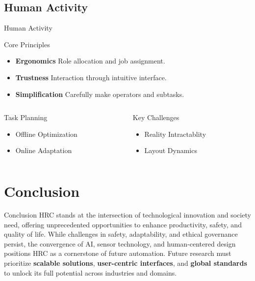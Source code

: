 \documentclass{beamer}
\begin{document}
\subsection{Human Activity}
\begin{frame}{Human Activity}

\begin{block}{Core Principles}
\begin{itemize}
\item \textbf{Ergonomics} Role allocation and job assignment.
\item \textbf{Trustness}  Interaction through intuitive interface.
\item \textbf{Simplification} Carefully make operators and subtasks.
\end{itemize}
\end{block}

\vspace{3mm}

\begin{columns}
\begin{column}{0.45\textwidth}
\begin{block}{Task Planning}
\begin{itemize}
\item Offline Optimization
\item Online Adaptation
\end{itemize}
\end{block}
\end{column}

\begin{column}{0.45\textwidth}
\begin{block}{Key Challenges}
\begin{itemize}
\item Reality Intractablity
\item Layout Dynamics
\end{itemize}
\end{block}
\end{column}
\end{columns}

\end{frame}

\section{Conclusion}
\begin{frame}{Conclusion}
\justifying
HRC stands at the intersection of technological innovation and society need, offering unprecedented opportunities to enhance productivity, safety, and quality of life. While challenges in safety, adaptability, and ethical governance persist, the convergence of AI, sensor technology, and human-centered design positions HRC as a cornerstone of future automation. Future research must prioritize \textbf{scalable solutions}, \textbf{user-centric interfaces}, and \textbf{global standards} to unlock its full potential across industries and domains.
\end{frame}
\end{document}
